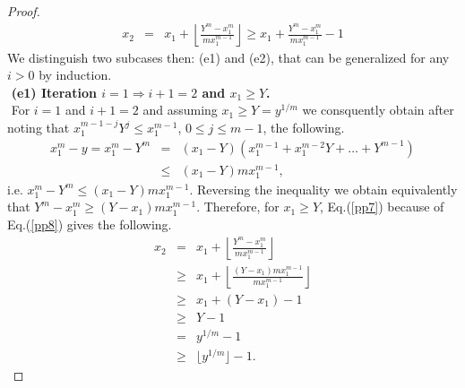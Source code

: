 \documentclass[11pt]{article}
\newcommand{\floor}[1]{\lfloor #1 \rfloor}
\begin{document}
\begin{proof}
\begin{eqnarray}
\label{pp7}
x_{2  } &=&
    x_1 + \left\lfloor
               \frac{Y^m - x_1^m}{mx_1^{m-1}}
         \right\rfloor
   \geq
    x_1 + \frac{Y^m - x_1^m}{mx_1^{m-1}} -1
\end{eqnarray}
We distinguish two   subcases then: (e1) and (e2), that
can be generalized for any $i>0$ by induction.
%
%
%
%
$ $ \\ $ $
{\bf (e1) Iteration $i=1 \Rightarrow i+1=2$ and $x_{1} \geq Y$.}
$ $ \\ $ $
For $i=1$ and $i+1=2$ and assuming $x_1 \geq Y= y^{1/m}$
we consquently obtain after noting that
$x_1^{m-1-j} Y^{j} \leq x_1^{m-1}$, $0\leq j \leq m-1$, the following.
\begin{eqnarray}
\label{pp8}
x_1^m - y  =
x_1^m - Y^m &=& ( x_1 - Y) ( x_1^{m-1} + x_{1}^{m-2}Y + \ldots + Y^{m-1})
\nonumber \\
          &\leq& (x_1 - Y ) m x_1^{m-1} ,
\end{eqnarray}
i.e. $x_1^m - Y^m \leq (x_1 - Y) m x_1^{m-1}$.
Reversing the inequality we obtain
equivalently that
$Y^m - x_1^m \geq (Y- x_1 ) m x_1^{m-1}$.
Therefore, for $x_1 \geq Y$,  Eq.(\ref{pp7}) because of
Eq.(\ref{pp8}) gives the following.
%
%
\begin{eqnarray}
\label{pp9}
x_{2  }
   & =  &
    x_1 + \left\lfloor
                \frac{Y^m-x_1^m}{mx_1^{m-1}}
         \right\rfloor \nonumber    \\
   &\geq&
    x_1 + \left\lfloor
                \frac{(Y-x_1 )m x_1^{m-1}}{mx_1^{m-1}}
          \right\rfloor \nonumber  \\
   &\geq&  x_1 + (Y-x_1 ) -1  \nonumber \\
   &\geq&  Y -1   \nonumber \\
   & =  &  y^{1/m} -1   \nonumber \\
   &\geq&  \floor{y^{1/m}} -1   .
\end{eqnarray}

\end{proof}
\end{document}
